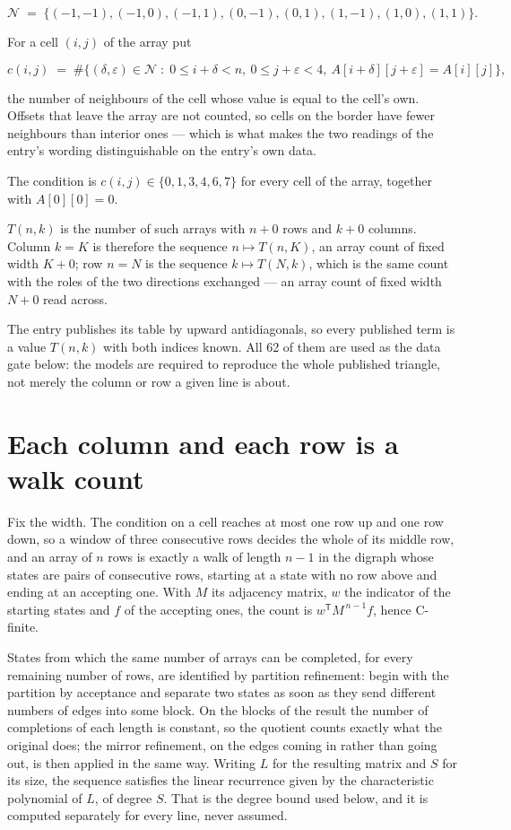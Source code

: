 \documentclass[11pt]{article}
\theoremstyle{definition}
\begin{document}
\[\mathcal{N} \;=\; \{(-1,-1), (-1,0), (-1,1), (0,-1), (0,1), (1,-1), (1,0), (1,1)\}.\]

For a cell $(i,j)$ of the array put

\[c(i,j) \;=\; \#\bigl\{(\delta,\varepsilon)\in\mathcal{N} \;:\; 0\le i+\delta<n,\ 0\le j+\varepsilon<4,\ A[i+\delta][j+\varepsilon] = A[i][j]\bigr\},\]

the number of neighbours of the cell whose value is equal to the cell's own. Offsets that leave the array are not counted, so cells on the border have fewer neighbours than interior ones --- which is what makes the two readings of the entry's wording distinguishable on the entry's own data.

The condition is $c(i,j) \in \{0, 1, 3, 4, 6, 7\}$ for every cell of the array, together with $A[0][0]=0$.

$T(n,k)$ is the number of such arrays with $n + 0$ rows and $k + 0$ columns. Column $k = K$ is therefore the sequence $n \mapsto T(n,K)$, an array count of fixed width $K + 0$; row $n = N$ is the sequence $k \mapsto T(N,k)$, which is the same count with the roles of the two directions exchanged --- an array count of fixed width $N + 0$ read across.

The entry publishes its table by upward antidiagonals, so every published term is a value $T(n,k)$ with both indices known. All 62 of them are used as the data gate below: the models are required to reproduce the whole published triangle, not merely the column or row a given line is about.

\section{Each column and each row is a walk count}

Fix the width. The condition on a cell reaches at most one row up and one row down, so a window of three consecutive rows decides the whole of its middle row, and an array of $n$ rows is exactly a walk of length $n-1$ in the digraph whose states are pairs of consecutive rows, starting at a state with no row above and ending at an accepting one. With $M$ its adjacency matrix, $w$ the indicator of the starting states and $f$ of the accepting ones, the count is $w^{\mathsf T}M^{\,n-1}f$, hence C-finite.

States from which the same number of arrays can be completed, for every remaining number of rows, are identified by partition refinement: begin with the partition by acceptance and separate two states as soon as they send different numbers of edges into some block. On the blocks of the result the number of completions of each length is constant, so the quotient counts exactly what the original does; the mirror refinement, on the edges coming in rather than going out, is then applied in the same way. Writing $L$ for the resulting matrix and $S$ for its size, the sequence satisfies the linear recurrence given by the characteristic polynomial of $L$, of degree $S$. That is the degree bound used below, and it is computed separately for every line, never assumed.
\end{document}
